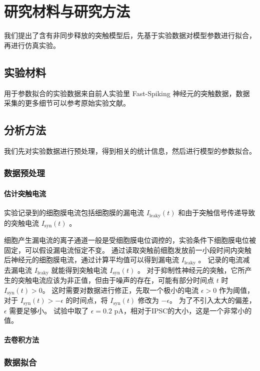 \chapter{研究材料与研究方法}
\label{chapter:methods}

我们提出了含有非同步释放的突触模型后，先基于实验数据对模型参数进行拟合，再进行仿真实验。

\section{实验材料}
\label{section:methods:materials}

用于参数拟合的实验数据来自前人实验里 Fast-Spiking 神经元的突触数据，数据采集的更多细节可以参考原始实验文献\cite{Jiang2012}。

\section{分析方法}
\label{section:methods:methods}

我们先对实验数据进行预处理，得到相关的统计信息，然后进行模型的参数拟合。

\subsection{数据预处理}
\label{section:methods:data-preprocessing}

\subsubsection{估计突触电流}
实验记录到的细胞膜电流包括细胞膜的漏电流 $I_\text{leaky}(t)$ 和由于突触信号传递导致的突触电流 $I_\text{syn}(t)$ 。

细胞产生漏电流的离子通道一般是受细胞膜电位调控的，实验条件下细胞膜电位被固定，可以假设漏电流恒定不变。
通过读取突触前细胞发放前一小段时间内突触后神经元的细胞膜电流，通过计算平均值可以得到漏电流 $I_\text{leaky}$ 。
记录的电流减去漏电流 $I_\text{leaky}$ 就能得到突触电流 $I_\text{syn}(t)$ 。
对于抑制性神经元的突触，它所产生的突触电流应该为非正值，但由于噪声的存在，可能有部分时间点 $t$ 时 $I_\text{syn}(t) > 0$。
这时需要对数据进行修正，先取一个极小的电流 $\epsilon > 0$ 作为阈值，对于 $I_\text{syn}(t) > -\epsilon$ 的时间点，将 $I_\text{syn}(t)$ 修改为 $-\epsilon$。
为了不引入太大的偏差， $\epsilon$ 需要足够小。
试验中取了 $\epsilon = 0.2$ pA，相对于IPSC的大小，这是一个非常小的值。

\subsubsection{去卷积方法}


\subsection{数据拟合}
\label{section:methods:data-fitting}
